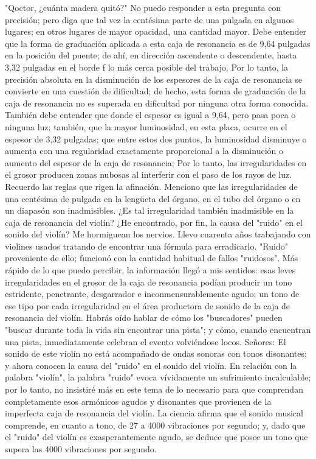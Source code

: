 "Qoctor, ¿cuánta madera quitó?" No puedo responder a esta pregunta con precisión; pero diga que tal vez la centésima parte de una pulgada en algunos lugares; en otros lugares de mayor opacidad, una cantidad mayor. Debe entender que la forma de graduación aplicada a esta caja de resonancia es de 9,64 pulgadas en la posición del puente; de ahí, en dirección ascendente o descendente, hasta 3,32 pulgadas en el borde f lo más cerca posible del trabajo. Por lo tanto, la precisión absoluta en la disminución de los espesores de la caja de resonancia se convierte en una cuestión de dificultad; de hecho, esta forma de graduación de la caja de resonancia no es superada en dificultad por ninguna otra forma conocida. También debe entender que donde el espesor es igual a 9,64, pero pasa poca o ninguna luz; también, que la mayor luminosidad, en esta placa, ocurre en el espesor de 3,32 pulgadas; que entre estos dos puntos, la luminosidad disminuye o aumenta con una regularidad exactamente proporcional a la disminución o aumento del espesor de la caja de resonancia; Por lo tanto, las irregularidades en el grosor producen zonas nubosas al interferir con el paso de los rayos de luz. Recuerdo las reglas que rigen la afinación. Menciono que las irregularidades de una centésima de pulgada en la lengüeta del órgano, en el tubo del órgano o en un diapasón son inadmisibles. \label{sobretonos_dis}
¿Es tal irregularidad también inadmisible en la caja de resonancia del violín? ¿He encontrado, por fin, la causa del "ruido" en el sonido del violín? Me hormiguean los nervios. Llevo cuarenta años trabajando con violines usados tratando de encontrar una fórmula para erradicarlo.
"Ruido" proveniente de ello; funcionó con la cantidad habitual de fallos "ruidosos". Más rápido de lo que puedo percibir, la información llegó a mis sentidos: esas leves irregularidades en el grosor de la caja de resonancia podían producir un tono estridente, penetrante, desgarrador e inconmensurablemente agudo; un tono de ese tipo por cada irregularidad en el área productora de sonido de la caja de resonancia del violín.
Habrás oído hablar de cómo los "buscadores" pueden "buscar durante toda la vida sin encontrar una pista"; y cómo, cuando encuentran una pista, inmediatamente celebran el evento volviéndose locos.
Señores: El sonido de este violín no está acompañado de ondas sonoras con tonos disonantes; y ahora conocen la causa del "ruido" en el sonido del violín. En relación con la palabra "violín", la palabra "ruido" evoca vívidamente un sufrimiento incalculable; por lo tanto, no insistiré más en este tema de lo necesario para que comprendan completamente esos armónicos agudos y disonantes que provienen de la imperfecta caja de resonancia del violín. La ciencia afirma que el sonido musical comprende, en cuanto a tono, de 27 a 4000 vibraciones por segundo; y, dado que el "ruido" del violín es exasperantemente agudo, se deduce que posee un tono que supera las 4000 vibraciones por segundo.
